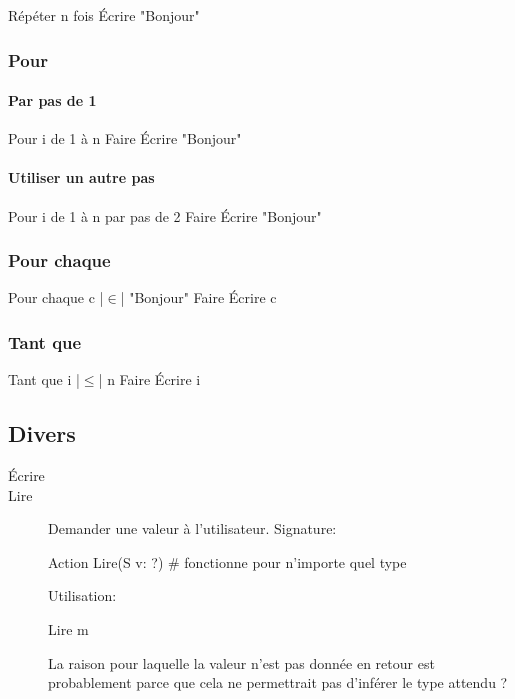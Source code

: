 \documentclass[10pt,a4paper,french]{article}
\begin{document}
\begin{exalgo}
Répéter n fois
    Écrire "Bonjour"
\end{exalgo}

\subsubsection{Pour}

\paragraph{Par pas de 1}
\begin{exalgo}
Pour i de 1 à n Faire
    Écrire "Bonjour"
\end{exalgo}

\paragraph{Utiliser un autre pas}
\begin{exalgo}
Pour i de 1 à n par pas de 2 Faire
    Écrire "Bonjour"
\end{exalgo}

\subsubsection{Pour chaque}
\begin{exalgo}
Pour chaque c |$\in$| "Bonjour" Faire
    Écrire c
\end{exalgo}

\subsubsection{Tant que}

\begin{exalgo}
Tant que i |$\leq$| n Faire
    Écrire i
\end{exalgo}

\subsection{Divers}

\begin{description}
\item[Écrire]
\item[Lire] Demander une valeur à l'utilisateur.
Signature:
\begin{exalgo}
Action Lire(S v: ?) # fonctionne pour n'importe quel type
\end{exalgo}
Utilisation:
\begin{exalgo}
Lire m
\end{exalgo}
La raison pour laquelle la valeur n'est pas donnée en retour est probablement parce que cela ne permettrait pas d'inférer le type attendu ?
\end{description}
\end{document}
